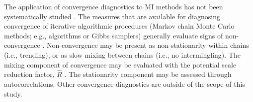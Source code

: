 \documentclass[article]{jss}
\begin{document}
The application of convergence diagnostics to MI methods has not been systematically studied \citep{buur18}. The measures that are available for diagnosing convergence of iterative algorithmic procedures (Markov chain Monte Carlo methods; e.g.,  algorithms or Gibbs samplers) generally evaluate signs of non-convergence \citep{hoff09}. Non-convergence may be present as non-stationarity within chains (i.e., trending), or as slow mixing between chains (i.e., no intermingling). The mixing component of convergence may be evaluated with the potential scale reduction factor, $\widehat{R}$ \citep[a.k.a. `Gelman-Rubin statistic';][]{gelm92}\footnotemark. The stationarity component may be assessed through autocorrelations. Other convergence diagnostics are outside of the scope of this study.

\end{document}

